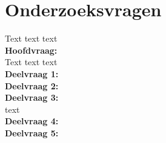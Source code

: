 \section{Onderzoeksvragen}
Text text text\\
\textbf{Hoofdvraag:} \textit{\MainQuestion} \\

Text text text\\

\textbf{Deelvraag 1:} \textit{\SubquestionOne}\\

\textbf{Deelvraag 2:} \textit{\SubquestionTwo} \\

\textbf{Deelvraag 3:} \textit{\SubquestionThree} \\
text\\ 
\textbf{Deelvraag 4:} \textit{\SubquestionFour} \\

\textbf{Deelvraag 5:} \textit{\SubquestionFive} \\
